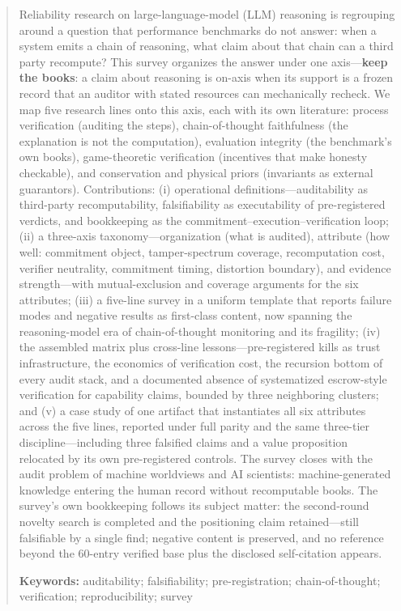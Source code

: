 \documentclass[11pt,a4paper]{article}
\begin{document}
\begin{abstract}


Reliability research on large-language-model (LLM) reasoning is regrouping around a question that performance benchmarks do not answer: when a system emits a chain of reasoning, what claim about that chain can a third party recompute? This survey organizes the answer under one axis—\textbf{keep the books}: a claim about reasoning is on-axis when its support is a frozen record that an auditor with stated resources can mechanically recheck. We map five research lines onto this axis, each with its own literature: process verification (auditing the steps), chain-of-thought faithfulness (the explanation is not the computation), evaluation integrity (the benchmark's own books), game-theoretic verification (incentives that make honesty checkable), and conservation and physical priors (invariants as external guarantors). Contributions: (i) operational definitions—auditability as third-party recomputability, falsifiability as executability of pre-registered verdicts, and bookkeeping as the commitment–execution–verification loop; (ii) a three-axis taxonomy—organization (what is audited), attribute (how well: commitment object, tamper-spectrum coverage, recomputation cost, verifier neutrality, commitment timing, distortion boundary), and evidence strength—with mutual-exclusion and coverage arguments for the six attributes; (iii) a five-line survey in a uniform template that reports failure modes and negative results as first-class content, now spanning the reasoning-model era of chain-of-thought monitoring and its fragility; (iv) the assembled matrix plus cross-line lessons—pre-registered kills as trust infrastructure, the economics of verification cost, the recursion bottom of every audit stack, and a documented absence of systematized escrow-style verification for capability claims, bounded by three neighboring clusters; and (v) a case study of one artifact that instantiates all six attributes across the five lines, reported under full parity and the same three-tier discipline—including three falsified claims and a value proposition relocated by its own pre-registered controls. The survey closes with the audit problem of machine worldviews and AI scientists: machine-generated knowledge entering the human record without recomputable books. The survey's own bookkeeping follows its subject matter: the second-round novelty search is completed and the positioning claim retained—still falsifiable by a single find; negative content is preserved, and no reference beyond the 60-entry verified base plus the disclosed self-citation appears.

\noindent\textbf{Keywords:} auditability; falsifiability; pre-registration; chain-of-thought; verification; reproducibility; survey
\end{abstract}
\end{document}
